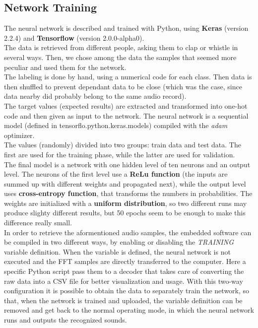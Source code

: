\documentclass[12pt]{article}
\begin{document}
\subsection{Network Training}
The neural network is described and trained with Python, using \textbf{Keras} (version 2.2.4) and \textbf{Tensorflow} (version 2.0.0-alpha0).\\
The data is retrieved from different people, asking them to clap or whistle in several ways. Then, we chose among the data the samples that seemed more peculiar and used them for the network.\\
The labeling is done by hand, using a numerical code for each class. Then data is then shuffled to prevent dependant data to be close (which was the case, since data nearby did probably belong to the same audio record).\\
The target values (expected results) are extracted and transformed into one-hot code and then given as input to the network. The neural network is a sequential model (defined in tensorflo.python.keras.models) compiled with the \textit{adam} optimizer.\\
The values (randomly) divided into two groups: train data and test data. The first are used for the training phase, while the latter are used for validation.\\
The final model is a network with one hidden level of ten neurons and an output level. The neurons of the first level use a \textbf{ReLu function} (the inputs are summed up with different weights and propagated next), while the output level uses \textbf{cross-entropy function}, that transforms the numbers in probabilities. The weights are initialized with a \textbf{uniform distribution}, so two different runs may produce slighty different results, but 50 epochs seem to be enough to make this difference really small.\\
In order to retrieve the aformentioned audio samples, the embedded software can be compiled in two different ways, by enabling or disabling the \textit{TRAINING} variable definition. When the variable is defined, the neural network is not executed and the FFT samples are directly transferred to the computer. Here a specific Python script pass them to a decoder that takes care of converting the raw data into a CSV file for better visualization and usage. With this two-way configuration it is possible to obtain the data to separately train the network, so that, when the network is trained and uploaded, the variable definition can be removed and get back to the normal operating mode, in which the neural network runs and outputs the recognized sounds.
\end{document}
